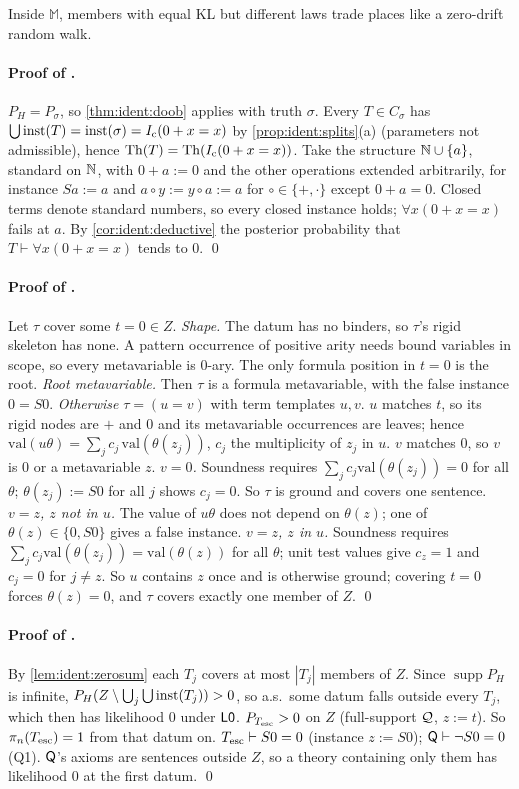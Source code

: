 Inside $\mathbb M$, members with equal KL but different laws trade places like a zero-drift random walk.

\paragraph{Proof of .} $P_H=P_\sigma$, so \cref{thm:ident:doob} applies with truth $\sigma$. Every $T\in C_\sigma$ has $\bigcup\mathrm{inst}(T)=\mathrm{inst}(\sigma)=I_{\mathrm{c}}(0+x=x)$ by \cref{prop:ident:splits}(a) (parameters not admissible), hence $\mathrm{Th}(T)=\mathrm{Th}(I_{\mathrm{c}}(0+x=x))$. Take the structure $\mathbb{N}\cup\{a\}$, standard on $\mathbb{N}$, with $0+a:=0$ and the other operations extended arbitrarily, for instance $Sa:=a$ and $a\circ y:=y\circ a:=a$ for $\circ\in\{+,\cdot\}$ except $0+a=0$. Closed terms denote standard numbers, so every closed instance holds; $\forall x(0+x=x)$ fails at $a$. By \cref{cor:ident:deductive} the posterior probability that $T\vdash\forall x(0+x=x)$ tends to $0$. \qed

\paragraph{Proof of .} Let $\tau$ cover some $t=0\in Z$.
\emph{Shape.} The datum has no binders, so $\tau$'s rigid skeleton has none. A pattern occurrence of positive arity needs bound variables in scope, so every metavariable is $0$-ary. The only formula position in $t=0$ is the root.
\emph{Root metavariable.} Then $\tau$ is a formula metavariable, with the false instance $0=S0$.
\emph{Otherwise} $\tau=(u=v)$ with term templates $u,v$. $u$ matches $t$, so its rigid nodes are $+$ and $0$ and its metavariable occurrences are leaves; hence $\mathrm{val}(u\theta)=\sum_jc_j\,\mathrm{val}(\theta(z_j))$, $c_j$ the multiplicity of $z_j$ in $u$. $v$ matches $0$, so $v$ is $0$ or a metavariable $z$.
\emph{$v=0$.} Soundness requires $\sum_jc_j\mathrm{val}(\theta(z_j))=0$ for all $\theta$; $\theta(z_j):=S0$ for all $j$ shows $c_j=0$. So $\tau$ is ground and covers one sentence.
\emph{$v=z$, $z$ not in $u$.} The value of $u\theta$ does not depend on $\theta(z)$; one of $\theta(z)\in\{0,S0\}$ gives a false instance.
\emph{$v=z$, $z$ in $u$.} Soundness requires $\sum_jc_j\mathrm{val}(\theta(z_j))=\mathrm{val}(\theta(z))$ for all $\theta$; unit test values give $c_z=1$ and $c_j=0$ for $j\ne z$. So $u$ contains $z$ once and is otherwise ground; covering $t=0$ forces $\theta(z)=0$, and $\tau$ covers exactly one member of $Z$. \qed

\paragraph{Proof of .} By \cref{lem:ident:zerosum} each $T_j$ covers at most $|T_j|$ members of $Z$. Since $\operatorname{supp}P_H$ is infinite, $P_H(Z\setminus\bigcup_j\bigcup\mathrm{inst}(T_j))>0$, so a.s.\ some datum falls outside every $T_j$, which then has likelihood $0$ under $\mathord{\mathsf{L0}}$. $P_{T_{\mathrm{esc}}}>0$ on $Z$ (full-support $\mathcal{Q}$, $z:=t$). So $\pi_n(T_{\mathrm{esc}})=1$ from that datum on. $T_{\mathrm{esc}}\vdash S0=0$ (instance $z:=S0$); $\mathsf{Q}\vdash\neg S0=0$ (Q1). $\mathsf{Q}$'s axioms are sentences outside $Z$, so a theory containing only them has likelihood $0$ at the first datum. \qed

